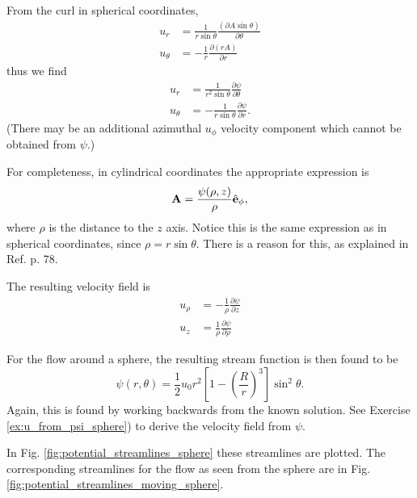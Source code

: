 From the curl in spherical coordinates,
\begin{align}
  u_r     &= \frac {1}{r\sin \theta }
            \frac{ \left( \partial A  \sin \theta \right) }{\partial \theta }  \\
  u_\theta &= -\frac1{r} \frac{\partial (rA) }{\partial r} 
\end{align}
thus we find
\begin{equation}
  \label{eq:u_from_psi_spherical}
  \begin{split}
    u_r     &=  \frac1{r^2 \sin\theta} \frac{\partial \psi}{\partial \theta} \\
    u_\theta &= -\frac1{r   \sin\theta} \frac{\partial \psi}{\partial r} .
  \end{split}
\end{equation}
(There may be an additional azimuthal $u_\phi$ velocity component
which cannot be obtained from $\psi$.)


For completeness, in cylindrical coordinates the appropriate
expression is
\[
  \mathbf{A} = \frac{\psi(\rho, z)}{ \rho } \hat{\mathbf{e}}_\phi ,
\]
where $\rho$ is the distance to the $z$ axis. Notice this is the same
expression as in spherical coordinates, since
$\rho=r\sin\theta$. There is a reason for this, as explained in
Ref. \cite{batchelor} p. 78.


The resulting velocity field is
\begin{equation*}
  \begin{split}
    u_\rho   &= - \frac1{\rho} \frac{\partial \psi}{\partial z} \\
    u_z     &=   \frac1{\rho} \frac{\partial \psi}{\partial \rho}
  \end{split}
\end{equation*}


For the flow around a sphere, the resulting stream function is then
found to be
\begin{equation}
  \label{eq:potential_sphere_stream}
  \psi(r,\theta) = \frac12 u_0 r^2
  \left[
    1 -
    \left(\frac{R}{r}\right)^3
  \right] \sin^2\theta .
\end{equation}
Again, this is found by working backwards from the known solution.
See Exercise \ref{ex:u_from_psi_sphere}) to derive the velocity field
from $\psi$.

In Fig. \ref{fig:potential_streamlines_sphere} these streamlines are
plotted. The corresponding streamlines for the flow as seen from the
sphere are in Fig. \ref{fig:potential_streamlines_moving_sphere}.

